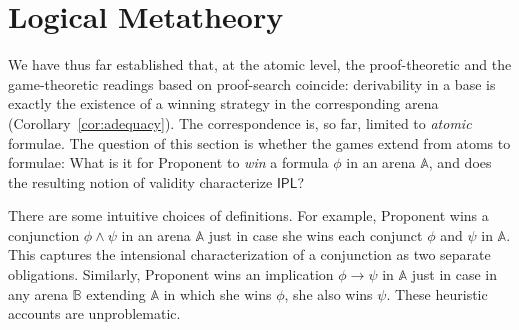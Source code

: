 \documentclass{lipics-v2021}
\newcommand{\arena}[1]{\mathbb{#1}}                     %
\newcommand{\IPL}{\textsf{IPL}}
\begin{document}
\section{Logical Metatheory}
\label{sec:metatheory}
We have thus far established that, at the atomic level, the
proof-theoretic and the game-theoretic readings based on proof-search coincide: derivability in a
base is exactly the existence of a winning strategy in the corresponding arena
(Corollary~\ref{cor:adequacy}). The correspondence is, so far, limited to \emph{atomic} formulae. The
question of this section is whether the games extend from atoms to formulae:
What is it for Proponent to \emph{win} a formula $\phi$ in an arena $\arena{A}$, and
does the resulting notion of validity characterize $\IPL$?

There are some intuitive choices of definitions. For example, Proponent wins a conjunction $\phi \land \psi$ in an arena $\arena{A}$ just
in case she wins each conjunct $\phi$ and $\psi$ in $\arena{A}$. This captures the intensional characterization of a
conjunction as two separate obligations. Similarly, Proponent
wins an implication $\phi \to \psi$ in $\arena{A}$ just in case in any arena
$\arena{B}$ extending $\arena{A}$ in which she wins $\phi$, she also wins $\psi$. These heuristic accounts are unproblematic.
 
\end{document}
